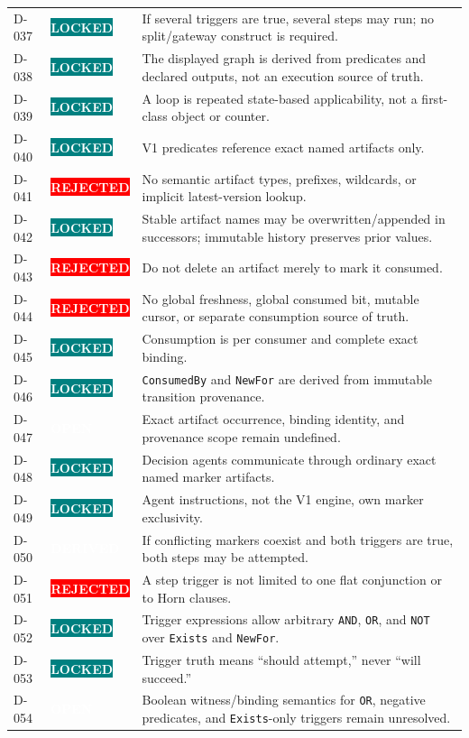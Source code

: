 \documentclass[11pt]{article}
\newcommand{\statuspill}[2]{%
  \begingroup\setlength{\fboxsep}{3pt}%
  \colorbox{#1}{\textcolor{white}{\sffamily\bfseries\scriptsize #2}}%
  \endgroup}
\newcommand{\Locked}{\statuspill{Teal}{LOCKED}}
\newcommand{\Derived}{\statuspill{Accent}{DERIVED}}
\newcommand{\Open}{\statuspill{Amber}{OPEN}}
\newcommand{\Rejected}{\statuspill{Red}{REJECTED}}
\newcommand{\artifact}[1]{\texttt{#1}}
\begin{document}
\begin{longtable}{@{}L{0.52in}L{0.88in}L{5.10in}@{}}
D-037 & \Locked & If several triggers are true, several steps may run; no split/gateway construct is required. \\
D-038 & \Locked & The displayed graph is derived from predicates and declared outputs, not an execution source of truth. \\
D-039 & \Locked & A loop is repeated state-based applicability, not a first-class object or counter. \\
D-040 & \Locked & V1 predicates reference exact named artifacts only. \\
D-041 & \Rejected & No semantic artifact types, prefixes, wildcards, or implicit latest-version lookup. \\
D-042 & \Locked & Stable artifact names may be overwritten/appended in successors; immutable history preserves prior values. \\
D-043 & \Rejected & Do not delete an artifact merely to mark it consumed. \\
D-044 & \Rejected & No global freshness, global consumed bit, mutable cursor, or separate consumption source of truth. \\
D-045 & \Locked & Consumption is per consumer and complete exact binding. \\
D-046 & \Locked & \artifact{ConsumedBy} and \artifact{NewFor} are derived from immutable transition provenance. \\
D-047 & \Open & Exact artifact occurrence, binding identity, and provenance scope remain undefined. \\
D-048 & \Locked & Decision agents communicate through ordinary exact named marker artifacts. \\
D-049 & \Locked & Agent instructions, not the V1 engine, own marker exclusivity. \\
D-050 & \Derived & If conflicting markers coexist and both triggers are true, both steps may be attempted. \\
D-051 & \Rejected & A step trigger is not limited to one flat conjunction or to Horn clauses. \\
D-052 & \Locked & Trigger expressions allow arbitrary \texttt{AND}, \texttt{OR}, and \texttt{NOT} over \artifact{Exists} and \artifact{NewFor}. \\
D-053 & \Locked & Trigger truth means ``should attempt,'' never ``will succeed.'' \\
D-054 & \Open & Boolean witness/binding semantics for \texttt{OR}, negative predicates, and \artifact{Exists}-only triggers remain unresolved. \\

\end{longtable}
\end{document}

